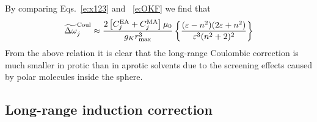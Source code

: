 \documentclass[a4paper,titlepage,twoside,fleqn,12pt]{book}
\begin{document}
\begin{refsection}
%
By comparing Eqs.~\eqref{e:x123} and ~\eqref{e:OKF}
we find that
%
\begin{equation} \label{e:x1234}
 \widetilde{\Delta \omega}_j^{\rm Coul} \approx 
\frac{2\left[ C^{\rm EA}_j + C^{\rm MA}_j \right]\mu_0}{g_Kr_{\rm max}^3}  
\left\{
\frac{(\varepsilon-n^2)(2\varepsilon+n^2)}{\varepsilon^3(n^2+2)^2}
\right\}
\end{equation}
%
From the above relation it is clear that the long\hyp{}range
Coulombic correction is much smaller in protic 
than in aprotic solvents due to the screening effects
caused by polar molecules inside the sphere.

\subsection{Long\hyp{}range induction correction}


\end{refsection}
\end{document}
